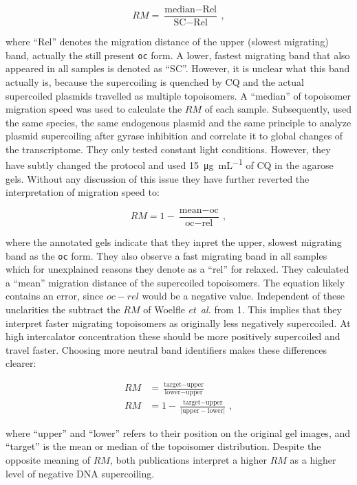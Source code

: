\documentclass[10pt,a4]{article}
\newcommand{\ugml}{\micro\gram\per\milli\liter}
\newcommand{\etal}{\textit{et~al.}}
\begin{document}
\begin{equation}
  RM = \frac{\text{median} - \text{Rel}}{\text{SC} - \text{Rel}}\,,
\end{equation}

where ``Rel'' denotes the migration distance of the upper (slowest
migrating) band, actually the still present \texttt{oc} form.
A lower, fastest migrating band that also appeared in all samples
is denoted as ``SC''. However, it is unclear what this band actually
is, because the supercoiling is quenched by CQ and the actual
supercoiled plasmids travelled as multiple topoisomers. A ``median'' of
topoisomer migration speed was used to calculate the $RM$ of each sample.
%
Subsequently, \citet{Vijayan2009} used the same species,
the same endogenous plasmid and the same principle to analyze plasmid
supercoiling after gyrase inhibition and correlate it to global
changes of the transcriptome. They only tested constant light
conditions.  However, they have subtly changed the protocol and used
\SI{15}{\ugml} of CQ in the agarose gels. Without any discussion of
this issue they have further reverted the interpretation of migration
speed to:

\begin{equation}
  RM = 1 - \frac{\text{mean} - \text{oc}}{\text{oc} - \text{rel}}\,,
\end{equation}

where the annotated gels indicate that they inpret the upper, slowest
migrating band as the \texttt{oc} form. They also observe a fast
migrating band in all samples which for unexplained reasons they
denote as a ``rel'' for relaxed. They calculated a ``mean'' migration
distance of the supercoiled topoisomers. The equation likely contains
an error, since $oc-rel$ would be a negative value. Independent of
these unclarities the subtract the $RM$ of Woelfle \etal{} from
1. This implies that they interpret faster migrating topoisomers
as originally less negatively supercoiled. At high intercalator
concentration these should be more positively supercoiled and travel
faster.
%
Choosing more neutral band identifiers makes these
differences clearer:

\begin{align}
  RM &= \frac{\text{target} - \text{upper}}{\text{lower} - \text{upper}}\\
  RM &=1-\frac{\text{target} - \text{upper}}{\lvert \text{upper} - \text{lower} \rvert}\,,
\end{align}

where ``upper'' and ``lower'' refers to their position on the original
gel images, and ``target'' is the mean or median of the topoisomer
distribution.  Despite the opposite meaning of $RM$, both publications
interpret a higher $RM$ as a higher level of negative DNA
supercoiling.
 
\end{document}
